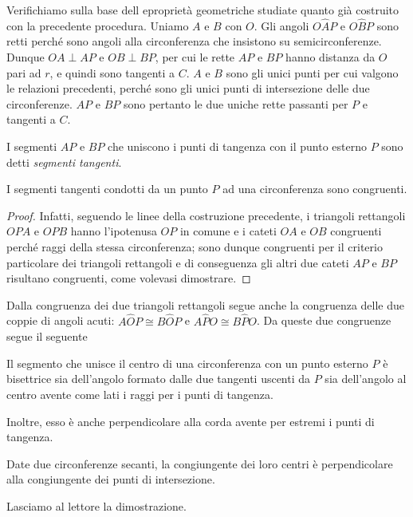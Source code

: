 Verifichiamo sulla base dell eproprietà geometriche studiate quanto già 
costruito con la precedente procedura.
Uniamo $A$ e $B$ con $O$. Gli angoli $O\widehat{A}P$ e $O\widehat{B}P$ sono 
retti perché sono angoli alla circonferenza che 
insistono su semicirconferenze. Dunque $OA\perp AP$ e $OB\perp BP$, 
per cui le rette $AP$ e $BP$ hanno distanza da $O$ pari ad $r$, e 
quindi sono tangenti a $C$. $A$ e $B$ sono gli unici punti per cui 
valgono le relazioni precedenti, perché sono gli unici punti di 
intersezione delle due circonferenze. $AP$ e $BP$ sono pertanto le 
due uniche rette passanti per $P$ e tangenti a $C$.

I segmenti $AP$ e $BP$ che uniscono i punti di tangenza con il punto 
esterno $P$ sono detti \emph{segmenti tangenti}.

\begin{teorema}
I segmenti tangenti condotti da un punto $P$ ad una circonferenza 
sono congruenti.
\end{teorema}

\begin{proof}
Infatti, seguendo le linee della costruzione precedente, i triangoli 
rettangoli $OPA$ e $OPB$ hanno l'ipotenusa $OP$ in comune e i cateti 
$OA$ e $OB$ congruenti perché raggi della stessa circonferenza; sono 
dunque congruenti per il criterio particolare dei triangoli 
rettangoli e di conseguenza gli altri due cateti $AP$ e $BP$ 
risultano congruenti, come volevasi dimostrare.
\end{proof}

Dalla congruenza dei due triangoli rettangoli segue anche la 
congruenza delle due coppie di angoli acuti: $A\widehat{O}P\cong 
B\widehat{O}P$ e $A\widehat{P}O\cong B\widehat{P}O$. Da queste due 
congruenze segue il seguente 
\begin{corollario}\label{cor:5.1}
Il segmento che unisce il centro di una circonferenza con un punto 
esterno $P$ è bisettrice sia dell'angolo formato dalle due tangenti 
uscenti da $P$ sia dell'angolo al centro avente come lati i raggi per 
i punti di tangenza.
\end{corollario}
Inoltre, esso è anche perpendicolare alla corda avente per estremi i 
punti di tangenza.

\begin{corollario}
Date due circonferenze secanti, la congiungente dei loro centri è 
perpendicolare alla congiungente dei punti di intersezione.
\end{corollario}

Lasciamo al lettore la dimostrazione.

